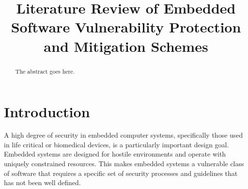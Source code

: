 \documentclass[draftcls,onecolumn,conference,12pt]{IEEEtran}
\begin{document}
%
\title{Literature Review of Embedded Software Vulnerability Protection and Mitigation Schemes}

\author{
}

\maketitle


\begin{abstract}
The abstract goes here.
\end{abstract}

\section{Introduction} 

A high degree of security in embedded computer systems, specifically those used in life critical or biomedical devices, is a particularly important design goal.  Embedded systems are designed for hostile environments and operate with uniquely constrained resources. This makes embedded systems a vulnerable class of software that requires a specific set of security processes and guidelines that has not been well defined.   
\end{document}
